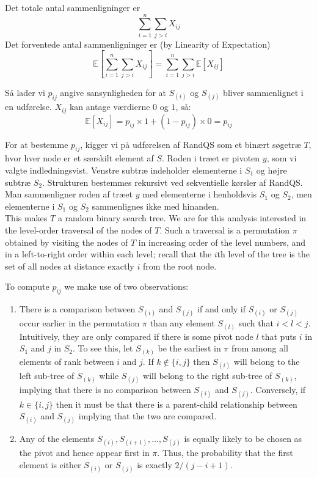 Det totale antal sammenligninger er 
\[
	\sum_{i=1}^n \sum_{j>i} X_{ij}
\]
Det forventede antal sammenligninger er (by Linearity of Expectation)
\[
	\mathbb{E}[\sum_{i=1}^n \sum_{j>i} X_{ij}] = \sum_{i=1}^n \sum_{j>i} \mathbb{E}[X_{ij}]
\]

Så lader vi $p_{ij}$ angive sansynligheden for at $S_{(i)}$ og $S_{(j)}$ bliver sammenlignet i en udførelse. $X_{ij}$ kan antage værdierne $0$ og $1$, så:
\[
	\mathbb{E}[X_{ij}] = p_{ij} \times 1 + (1 - p_{ij}) \times 0 = p_{ij}
\]

For at bestemme $p_{ij}$, kigger vi på udførelsen af RandQS som et binært søgetræ $T$, hvor hver node er et særskilt element af $S$. Roden i træet er pivoten $y$, som vi valgte indledningsvist. Venstre subtræ indeholder elementerne i $S_1$ og højre subtræ $S_2$. Strukturen bestemmes rekursivt ved sekventielle kørsler af RandQS. Man sammenligner roden af træet $y$ med elementerne i henholdsvis $S_1$ og $S_2$, men elementerne i $S_1$ og $S_2$ sammenlignes ikke med hinanden. \\


This makes $T$ a random binary search tree. We are for this analysis interested in the level-order traversal of the
nodes of $T$. Such a traversal is a permutation $\pi$ obtained by visiting the nodes of $T$ in increasing order of
the level numbers, and in a left-to-right order within each level; recall that the $i$th level of the tree is the set
of all nodes at distance exactly $i$ from the root node.

To compute $p_{ij}$ we make use of two observations:

\begin{enumerate}
	\item There is a comparison between $S_{(i)}$ and $S_{(j)}$ if and only if $S_{(i)}$ or $S_{(j)}$ occur
	earlier in the permutation $\pi$ than any element $S_{(l)}$ such that $i < l < j$. Intuitively, they are
	only compared if there is some pivot node $l$ that puts $i$ in $S_1$ and $j$ in $S_2$. To see this, let
	$S_{(k)}$ be the earliest in $\pi$ from among all elements of rank between $i$ and $j$. If $k \notin \{i,j\}$
	then $S_{(i)}$ will belong to the left sub-tree of $S_{(k)}$ while $S_{(j)}$ will belong to the right sub-tree
	of $S_{(k)}$, implying that there is no comparison between $S_{(i)}$ and $S_{(j)}$. Conversely, if
	$k \in \{i,j\}$ then it must be that there is a parent-child relationship between $S_{(i)}$ and $S_{(j)}$
	implying that the two are compared.

	\item Any of the elements $S_{(i)}, S_{(i+1)}, \hdots, S_{(j)}$ is equally likely to be chosen as the pivot and
	hence appear first in $\pi$. Thus, the probability that the first element is either $S_{(i)}$ or $S_{(j)}$ is
	exactly $2 / (j - i + 1)$.
\end{enumerate}

